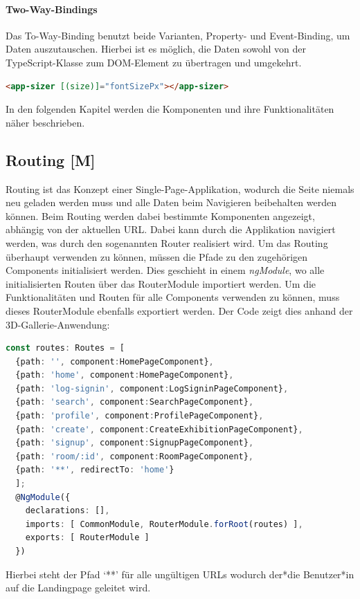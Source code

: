 \paragraph{Two-Way-Bindings}
Das To-Way-Binding benutzt beide Varianten, Property- und Event-Binding, um Daten auszutauschen. Hierbei ist es möglich, die Daten sowohl von der TypeScript-Klasse zum DOM-Element zu übertragen und umgekehrt. \cite{AngularTwoWayBinding}
\begin{lstlisting}[caption={{Beispiel für Two-Way-Bindings \cite{AngularTwoWayBinding}}},language=HTML,label=lst:impl:two-way-bindings]
    <app-sizer [(size)]="fontSizePx"></app-sizer>
\end{lstlisting}
In den folgenden Kapitel werden die Komponenten und ihre Funktionalitäten näher beschrieben. 

\subsection{Routing [M]}\label{sec:Routing}
Routing ist das Konzept einer Single-Page-Applikation, wodurch die Seite niemals neu geladen werden muss und alle Daten beim Navigieren beibehalten werden können. Beim Routing werden dabei bestimmte Komponenten angezeigt, abhängig von der aktuellen URL. Dabei kann durch die Applikation navigiert werden, was durch den sogenannten Router realisiert wird.  Um das Routing überhaupt verwenden zu können, müssen die Pfade zu den zugehörigen Components initialisiert werden. Dies geschieht in einem \emph{ngModule}, wo alle initialisierten Routen über das RouterModule importiert werden. Um die Funktionalitäten und Routen für alle Components verwenden zu können, muss dieses RouterModule ebenfalls exportiert werden. Der Code zeigt dies anhand der 3D-Gallerie-Anwendung: \cite{AngularBuch}
\begin{lstlisting}[caption={Routing in der 3D-Gallery},language=TypeScript,label=lst:impl:routing]
const routes: Routes = [
  {path: '', component:HomePageComponent},
  {path: 'home', component:HomePageComponent},
  {path: 'log-signin', component:LogSigninPageComponent},
  {path: 'search', component:SearchPageComponent},
  {path: 'profile', component:ProfilePageComponent},
  {path: 'create', component:CreateExhibitionPageComponent},
  {path: 'signup', component:SignupPageComponent},
  {path: 'room/:id', component:RoomPageComponent},
  {path: '**', redirectTo: 'home'}
  ];
  @NgModule({
    declarations: [],
    imports: [ CommonModule, RouterModule.forRoot(routes) ],
    exports: [ RouterModule ]
  })

\end{lstlisting}
Hierbei steht der Pfad ‘**’ für alle ungültigen URLs wodurch der*die Benutzer*in auf die Landingpage geleitet wird.

